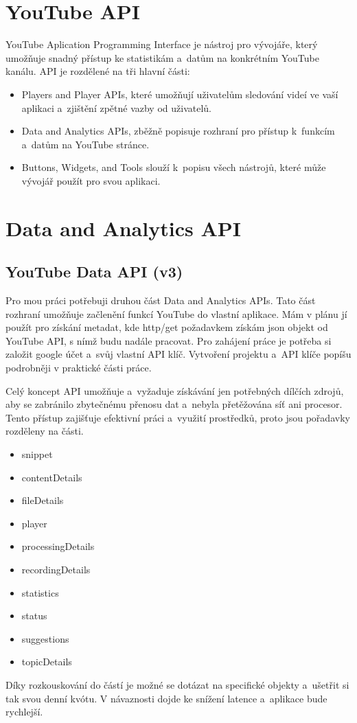 \section{YouTube API}
\par YouTube Aplication Programming Interface\cite{apistart} je nástroj pro vývojáře, který umožňuje snadný přístup ke statistikám a~datům na konkrétním YouTube kanálu. API je rozdělené na tři hlavní části:
\begin{itemize}
	\item{Players and Player APIs, které umožňují uživatelům sledování videí ve vaší aplikaci a~zjištění zpětné vazby od uživatelů.}
	\item{Data and Analytics APIs, zběžně popisuje rozhraní pro přístup k~funkcím a~datům na YouTube stránce.}
	\item{Buttons, Widgets, and Tools slouží k~popisu všech nástrojů, které může vývojář použít pro svou aplikaci.}
\end{itemize}

\section{Data and Analytics API}
\subsection{YouTube Data API (v3)}
\par Pro mou práci potřebuji druhou část Data and Analytics APIs\cite{apistart}\cite{apiv3}. Tato část rozhraní umožňuje začlenění funkcí YouTube do vlastní aplikace. Mám v plánu jí použít pro získání metadat, kde http/get požadavkem získám json objekt od YouTube API, s nímž budu nadále pracovat. Pro zahájení práce je potřeba si založit google účet a~svůj vlastní API klíč. Vytvoření projektu a~API klíče popíšu podrobněji v praktické části práce.
\par Celý koncept API umožňuje a~vyžaduje získávání jen potřebných dílčích zdrojů, aby se zabránilo zbytečnému přenosu dat a~nebyla přetěžována síť ani procesor. Tento přístup zajišťuje efektivní práci a~využití prostředků, proto jsou pořadavky rozděleny na části. 
\begin{itemize} 
\item{snippet}
\item{contentDetails}
\item{fileDetails}
\item{player}
\item{processingDetails}
\item{recordingDetails}
\item{statistics}
\item{status}
\item{suggestions}
\item{topicDetails}
\end{itemize}
\par Díky rozkouskování do částí je možné se dotázat na specifické objekty a~ušetřit si tak svou denní kvótu. V návaznosti dojde ke snížení latence a~aplikace bude rychlejší. 

